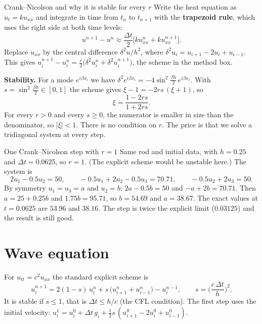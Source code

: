 \begin{derivbox}{Crank--Nicolson and why it is stable for every $r$}
Write the heat equation as $u_t = ku_{xx}$ and integrate in time from $t_n$ to $t_{n+1}$ with the \textbf{trapezoid rule}, which uses the right side at both time levels:
\[ u^{n+1} - u^n \approx \frac{\Delta t}{2}\Big[ku_{xx}^{n} + ku_{xx}^{n+1}\Big]. \]
Replace $u_{xx}$ by the central difference $\delta^2u/h^2$, where $\delta^2u_i = u_{i+1} - 2u_i + u_{i-1}$. This gives $u_i^{n+1} - u_i^n = \frac r2\big(\delta^2u_i^n + \delta^2u_i^{n+1}\big)$, the scheme in the method box.

\textbf{Stability.} For a mode $e^{i\beta x_i}$ we have $\delta^2e^{i\beta x_i} = -4\sin^2\!\frac{\beta h}{2}\,e^{i\beta x_i}$. With $s = \sin^2\frac{\beta h}{2}\in[0,1]$ the scheme gives $\xi - 1 = -2rs\,(\xi + 1)$, so
\[ \xi = \frac{1 - 2rs}{1 + 2rs}. \]
For every $r>0$ and every $s\ge0$, the numerator is smaller in size than the denominator, so $|\xi|<1$. There is no condition on $r$. The price is that we solve a tridiagonal system at every step.
\end{derivbox}

\begin{examplebox}{One Crank--Nicolson step with $r=1$}
Same rod and initial data, with $h=0.25$ and $\Delta t = 0.0625$, so $r=1$. (The explicit scheme would be unstable here.) The system is
\[ 2u_1 - 0.5u_2 = 50,\qquad -0.5u_1 + 2u_2 - 0.5u_3 = 70.71,\qquad -0.5u_2 + 2u_3 = 50. \]
By symmetry $u_1=u_3=a$ and $u_2=b$: $2a - 0.5b = 50$ and $-a + 2b = 70.71$. Then $a = 25 + 0.25b$ and $1.75b = 95.71$, so $b = 54.69$ and $a = 38.67$. The exact values at $t=0.0625$ are $53.96$ and $38.16$. The step is twice the explicit limit ($0.03125$) and the result is still good.
\end{examplebox}

\section{Wave equation}

For $u_{tt} = c^2u_{xx}$ the standard explicit scheme is
\[ u_i^{n+1} = 2(1-s)\,u_i^n + s\,\big(u_{i+1}^n + u_{i-1}^n\big) - u_i^{n-1},\qquad s = \Big(\frac{c\,\Delta t}{h}\Big)^2 . \]
It is stable if $s\le1$, that is $\Delta t\le h/c$ (the CFL condition). The first step uses the initial velocity: $u_i^1 = u_i^0 + \Delta t\,g_i + \tfrac12 s\,(u_{i+1}^0 - 2u_i^0 + u_{i-1}^0)$.

